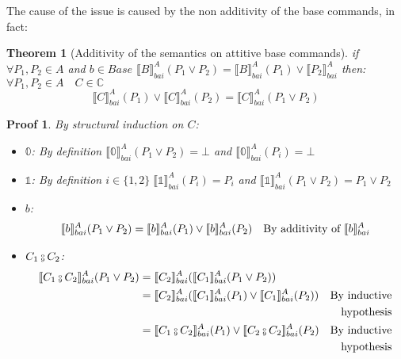 \documentclass{article}
\newtheorem{theorem}{Theorem}
\newtheorem{proofs}{Proof}
\newcommand*{\sem}[1]{
    \llbracket #1 \rrbracket
}
\newcommand{\bca}[2]{
    #2_{bai}^{#1}
}
\newcommand{\bsem}[2][A]{
    \bca{#1}{\sem{#2}}
}
\def\fcmp{\mathbin{\raise 0.6ex\hbox{\oalign{\hfil$\scriptscriptstyle      
    \mathrm{o}$\hfil\cr\hfil$\scriptscriptstyle\mathrm{9}$\hfil}}}}
\def\lang{\mathbb{C}}
\begin{document}
    The cause of the issue is caused by the non additivity of the base commands,
    in fact:
    \begin{theorem}[Additivity of the semantics on attitive base commands]
        \label{thm:add}
        if $\forall P_1, P_2 \in A$ and $b \in Base$ $\bsem{B}(P_1 \lor P_2)
        = \bsem{B}(P_1) \lor \bsem{P_2}$ then:
        $\forall P_1, P_2 \in A \quad C \in \lang$
        $$\bsem{C}(P_1) \lor \bsem{C}(P_2) = \bsem{C}(P_1 \lor P_2)$$
    \end{theorem}
    \begin{proofs}
        By structural induction on $C$:
        \begin{itemize}
            \item $\mathbb{0}$:
                By definition $\bsem{\mathbb{0}}(P_1 \lor P_2) = \bot$
                and $\bsem{\mathbb{0}}(P_i) = \bot$

            \item $\mathbb{1}$:
                By definition $i \in \{1, 2\} \; \bsem{\mathbb{1}}(P_i) = P_i$
                and $\bsem{\mathbb{1}}(P_1 \lor P_2) = P_1 \lor P_2$

            \item $b$:
                \begin{align*}
                    \bsem{b}(P_1 \lor P_2)
                        &= \bsem{b}(P_1) \lor \bsem{b}(P_2)
                        &\text{By additivity of $\bsem{b}$} \\
                \end{align*}

            \item $C_1 \fcmp C_2$:
                \begin{align*}
                    \bsem{C_1 \fcmp C_2}(P_1 \lor P_2)
                        &= \bsem{C_2}(\bsem{C_1}(P_1 \lor P_2)) \\
                        &= \bsem{C_2}(\bsem{C_1}(P_1) \lor \bsem{C_1}(P_2))
                        &\text{By inductive} \\
                        &&\text{hypothesis} \\
                        &= \bsem{C_1 \fcmp C_2}(P_1) 
                            \lor \bsem{C_2 \fcmp C_2}(P_2)
                        &\text{By inductive} \\ && \text{hypothesis} \\
                \end{align*}


\end{itemize}
\end{proofs}
\end{document}
